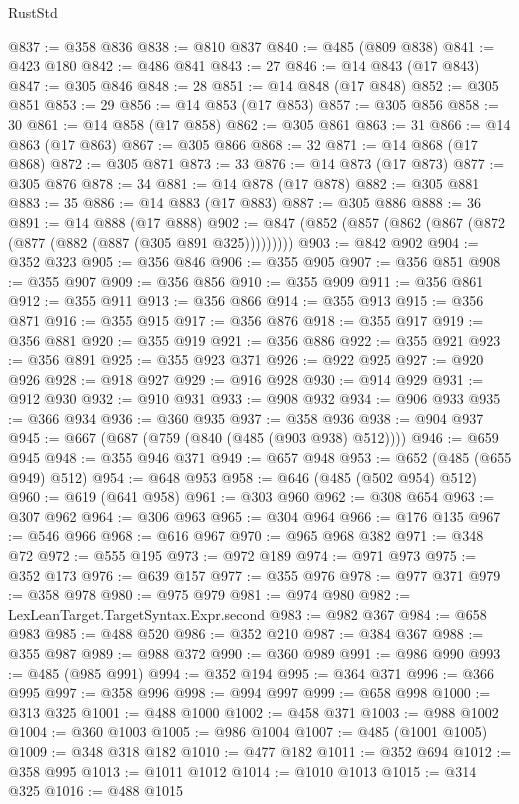 \begin{lexlean}{RustStd}
\begin{coremodule}
@837 := @358 @836
@838 := @810 @837
@840 := @485 (@809 @838)
@841 := @423 @180
@842 := @486 @841
@843 := 27
@846 := @14 @843 (@17 @843)
@847 := @305 @846
@848 := 28
@851 := @14 @848 (@17 @848)
@852 := @305 @851
@853 := 29
@856 := @14 @853 (@17 @853)
@857 := @305 @856
@858 := 30
@861 := @14 @858 (@17 @858)
@862 := @305 @861
@863 := 31
@866 := @14 @863 (@17 @863)
@867 := @305 @866
@868 := 32
@871 := @14 @868 (@17 @868)
@872 := @305 @871
@873 := 33
@876 := @14 @873 (@17 @873)
@877 := @305 @876
@878 := 34
@881 := @14 @878 (@17 @878)
@882 := @305 @881
@883 := 35
@886 := @14 @883 (@17 @883)
@887 := @305 @886
@888 := 36
@891 := @14 @888 (@17 @888)
@902 := @847 (@852 (@857 (@862 (@867 (@872 (@877 (@882 (@887 (@305 @891 @325)))))))))
@903 := @842 @902
@904 := @352 @323
@905 := @356 @846
@906 := @355 @905
@907 := @356 @851
@908 := @355 @907
@909 := @356 @856
@910 := @355 @909
@911 := @356 @861
@912 := @355 @911
@913 := @356 @866
@914 := @355 @913
@915 := @356 @871
@916 := @355 @915
@917 := @356 @876
@918 := @355 @917
@919 := @356 @881
@920 := @355 @919
@921 := @356 @886
@922 := @355 @921
@923 := @356 @891
@925 := @355 @923 @371
@926 := @922 @925
@927 := @920 @926
@928 := @918 @927
@929 := @916 @928
@930 := @914 @929
@931 := @912 @930
@932 := @910 @931
@933 := @908 @932
@934 := @906 @933
@935 := @366 @934
@936 := @360 @935
@937 := @358 @936
@938 := @904 @937
@945 := @667 (@687 (@759 (@840 (@485 (@903 @938) @512))))
@946 := @659 @945
@948 := @355 @946 @371
@949 := @657 @948
@953 := @652 (@485 (@655 @949) @512)
@954 := @648 @953
@958 := @646 (@485 (@502 @954) @512)
@960 := @619 (@641 @958)
@961 := @303 @960
@962 := @308 @654
@963 := @307 @962
@964 := @306 @963
@965 := @304 @964
@966 := @176 @135
@967 := @546 @966
@968 := @616 @967
@970 := @965 @968 @382
@971 := @348 @72
@972 := @555 @195
@973 := @972 @189
@974 := @971 @973
@975 := @352 @173
@976 := @639 @157
@977 := @355 @976
@978 := @977 @371
@979 := @358 @978
@980 := @975 @979
@981 := @974 @980
@982 := LexLeanTarget.TargetSyntax.Expr.second
@983 := @982 @367
@984 := @658 @983
@985 := @488 @520
@986 := @352 @210
@987 := @384 @367
@988 := @355 @987
@989 := @988 @372
@990 := @360 @989
@991 := @986 @990
@993 := @485 (@985 @991)
@994 := @352 @194
@995 := @364 @371
@996 := @366 @995
@997 := @358 @996
@998 := @994 @997
@999 := @658 @998
@1000 := @313 @325
@1001 := @488 @1000
@1002 := @458 @371
@1003 := @988 @1002
@1004 := @360 @1003
@1005 := @986 @1004
@1007 := @485 (@1001 @1005)
@1009 := @348 @318 @182
@1010 := @477 @182
@1011 := @352 @694
@1012 := @358 @995
@1013 := @1011 @1012
@1014 := @1010 @1013
@1015 := @314 @325
@1016 := @488 @1015

\end{coremodule}
\end{lexlean}
